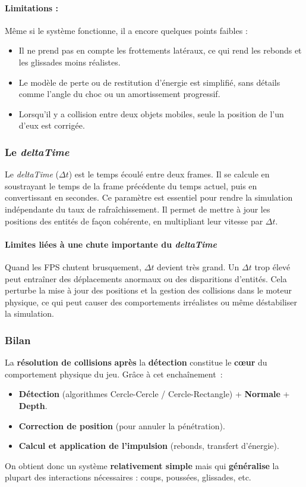 \documentclass[a4paper,11pt]{article}
\begin{document}
\paragraph{Limitations :}
Même si le système fonctionne, il a encore quelques points faibles :
\begin{itemize}
    \item Il ne prend pas en compte les frottements latéraux, ce qui rend les rebonds et les glissades moins réalistes.
    \item Le modèle de perte ou de restitution d'énergie est simplifié, sans détails comme l’angle du choc ou un amortissement progressif.
    \item Lorsqu’il y a collision entre deux objets mobiles, seule la position de l’un d’eux est corrigée.
\end{itemize}

\subsubsection{Le \textit{deltaTime}}
Le \textit{deltaTime} (\(\Delta t\)) est le temps écoulé entre deux frames. Il se calcule en soustrayant le temps de la frame précédente du temps actuel, puis en convertissant en secondes. Ce paramètre est essentiel pour rendre la simulation indépendante du taux de rafraîchissement. Il permet de mettre à jour les positions des entités de façon cohérente, en multipliant leur vitesse par \(\Delta t\).

\paragraph{Limites liées à une chute importante du \textit{deltaTime}}
Quand les FPS chutent brusquement, \(\Delta t\) devient très grand. Un \(\Delta t\) trop élevé peut entraîner des déplacements anormaux ou des disparitions d’entités. Cela perturbe la mise à jour des positions et la gestion des collisions dans le moteur physique, ce qui peut causer des comportements irréalistes ou même déstabiliser la simulation.

\subsubsection{Bilan}
La \textbf{résolution de collisions} \textbf{après} la \textbf{détection} constitue le \textbf{cœur} du comportement \og physique \fg{} du jeu. Grâce à cet enchaînement~:
\begin{itemize}
    \item \textbf{Détection} (algorithmes Cercle-Cercle / Cercle-Rectangle) + \textbf{Normale} + \textbf{Depth}.
    \item \textbf{Correction de position} (pour annuler la pénétration).
    \item \textbf{Calcul et application de l’impulsion} (rebonds, transfert d’énergie).
\end{itemize}
On obtient donc un système \textbf{relativement simple} mais qui \textbf{généralise} la plupart des interactions nécessaires : coups, poussées, glissades, etc.
\end{document}

